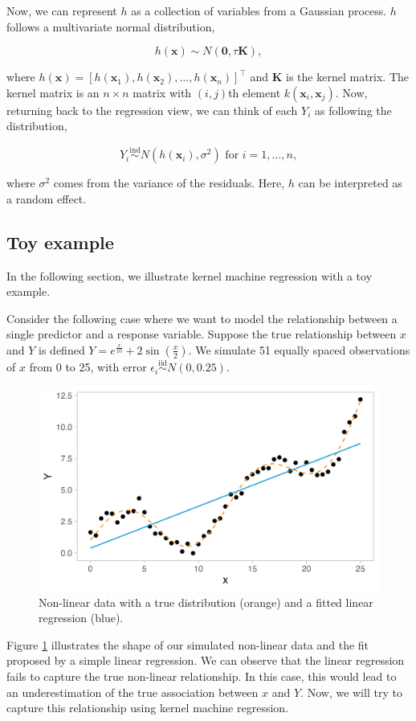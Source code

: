 \documentclass[12pt, twoside]{amherstthesis}
\begin{document}
Now, we can represent \(h\) as a collection of variables from a Gaussian process. \(h\) follows a multivariate normal distribution,

\[
h({\textbf{x}}) \sim N(\textbf{0}, \tau\textbf{K}),
\]

\noindent where \(h({\textbf{x}}) = [h(\textbf{x}_1), h(\textbf{x}_2), \dots, h(\textbf{x}_n)]^\top\) and \(\textbf{K}\) is the kernel matrix. The kernel matrix is an \(n \times n\) matrix with \((i, j)\)th element \(k(\textbf{x}_i, \textbf{x}_j)\). Now, returning back to the regression view, we can think of each \(Y_i\) as following the distribution,

\[
Y_i \overset{\mathrm{ind}}{\sim} N(h(\textbf{x}_i), \sigma^2) \text{ for } i = 1,\dots,n,
\]

\noindent where \(\sigma^2\) comes from the variance of the residuals. Here, \(h\) can be interpreted as a random effect.

\hypertarget{bkmrtoy}{%
\subsection{Toy example}\label{bkmrtoy}}

In the following section, we illustrate kernel machine regression with a toy example.

Consider the following case where we want to model the relationship between a single predictor and a response variable. Suppose the true relationship between \(x\) and \(Y\) is defined \(Y = e^{\frac{x}{10}} + 2\sin(\frac{x}{2})\). We simulate 51 equally spaced observations of \(x\) from 0 to 25, with error \(\epsilon_i \overset{\text{iid}}\sim N(0, 0.25)\).
\begin{figure}

{\centering \includegraphics[width=0.75\linewidth]{figures/ch3_toy1} 

}

\caption{Non-linear data with a true distribution (orange) and a fitted linear regression (blue).}\label{fig:toy1}
\end{figure}
Figure \ref{fig:toy1} illustrates the shape of our simulated non-linear data and the fit proposed by a simple linear regression. We can observe that the linear regression fails to capture the true non-linear relationship. In this case, this would lead to an underestimation of the true association between \(x\) and \(Y\). Now, we will try to capture this relationship using kernel machine regression.
\end{document}

